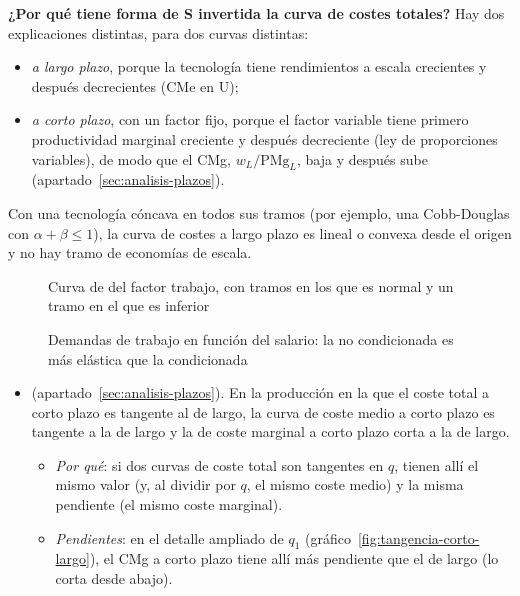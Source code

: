 \documentclass[11pt]{article}
\begin{document}
\begin{anotaciones}
\textbf{¿Por qué tiene forma de S invertida la curva de costes totales?} Hay dos explicaciones distintas, para dos curvas distintas:
\begin{itemize}
\item \emph{a largo plazo}, porque la tecnología tiene rendimientos a escala crecientes y después decrecientes (CMe en U);
\item \emph{a corto plazo}, con un factor fijo, porque el factor variable tiene primero productividad marginal creciente y después decreciente (ley de proporciones variables), de modo que el CMg, $w_L/\mathrm{PMg}_L$, baja y después sube (apartado~\ref{sec:analisis-plazos}).
\end{itemize}
Con una tecnología cóncava en todos sus tramos (por ejemplo, una Cobb-Douglas con $\alpha+\beta\leq 1$), la curva de costes a largo plazo es lineal o convexa desde el origen y no hay tramo de economías de escala.
\end{anotaciones}

\begin{figure}[H]
\centering
\caption{Curva de  del factor trabajo, con tramos en los que es normal y un tramo en el que es inferior}\label{fig:curva-engel-factor}
\end{figure}

\begin{figure}[H]
\centering
\caption{Demandas de trabajo en función del salario: la no condicionada es más elástica que la condicionada}\label{fig:demanda-factor-precio}
\end{figure}

\begin{itemize}
\item {} (apartado~\ref{sec:analisis-plazos}). En la producción en la que el coste total a corto plazo es tangente al de largo, la curva de coste medio a corto plazo es tangente a la de largo y la de coste marginal a corto plazo corta a la de largo.
  \begin{itemize}
  \item \emph{Por qué}: si dos curvas de coste total son tangentes en $q$, tienen allí el mismo valor (y, al dividir por $q$, el mismo coste medio) y la misma pendiente (el mismo coste marginal).
  \item \emph{Pendientes}: en el detalle ampliado de $q_1$ (gráfico~\ref{fig:tangencia-corto-largo}), el CMg a corto plazo tiene allí más pendiente que el de largo (lo corta desde abajo).
  \end{itemize}
\end{itemize}
\end{document}
